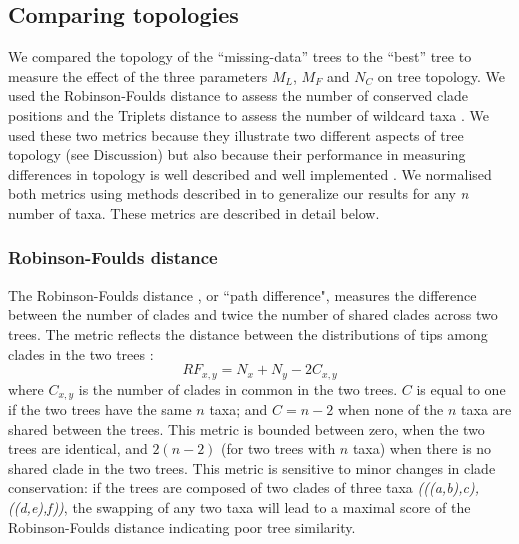 
\subsection{Comparing topologies}
We compared the topology of the ``missing-data'' trees to the ``best'' tree to measure the effect of the three parameters $M_{L}$, $M_{F}$ and $N_{C}$ on tree topology.
We used the Robinson-Foulds distance \citep{RF1981} to assess the number of conserved clade positions and the Triplets distance \citep{dobson1975triplets} to assess the number of wildcard taxa \citep[i.e. taxa that frequently change position in different trees][]{kearneyfragmentary2002}. We used these two metrics because they illustrate two different aspects of tree topology (see Discussion) but also because their performance in measuring differences in topology is well described \citep{Kuhner04112014} and well implemented \citep{Bogdanowicz2012}.
We normalised both metrics using methods described in \citet{Bogdanowicz2012} to generalize our results for any \textit{n} number of taxa.
These metrics are described in detail below.

\subsubsection*{Robinson-Foulds distance}
The Robinson-Foulds distance \citep{RF1981}, or ``path difference", measures the difference between the number of clades and twice the number of shared clades across two trees.
The metric reflects the distance between the distributions of tips among clades in the two trees \citep{RF1981}:
\begin{equation}
RF_{x,y} = N_{x} + N_{y} - 2C_{x,y}
\end{equation}
where $C_{x,y}$ is the number of clades in common in the two trees.
$C$ is equal to one if the two trees have the same $n$ taxa; and $C = n-2$ when none of the $n$ taxa are shared between the trees.
This metric is bounded between zero, when the two trees are identical, and $2(n-2)$ (for two trees with $n$ taxa) when there is no shared clade in the two trees.
This metric is sensitive to minor changes in clade conservation: if the trees are composed of two clades of three taxa \textit{(((a,b),c),((d,e),f))}, the swapping of any two taxa will lead to a maximal score of the Robinson-Foulds distance indicating poor tree similarity.

